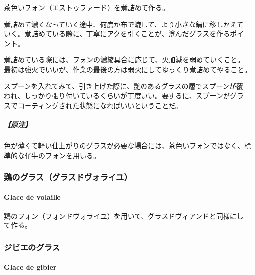 \begin{recette}
茶色いフォン（エストゥファード）を煮詰めて作る。

煮詰めて濃くなっていく途中、何度か布で漉して、より小さな鍋に移しかえて
いく。煮詰めている際に、丁寧にアクを引くことが、澄んだグラスを作るポイ
ント。

煮詰めている際には、フォンの濃縮具合に応じて、火加減を弱めていくこと。
最初は強火でいいが、作業の最後の方は弱火にしてゆっくり煮詰めてやること。

スプーンを入れてみて、引き上げた際に、艶のあるグラスの層でスプーンが覆
われ、しっかり張り付いているくらいが丁度いい。要するに、スプーンがグラ
スでコーティングされた状態になればいいということだ。

\hypertarget{nota-glace-de-viande}{%
\subparagraph{【原注】}\label{nota-glace-de-viande}}

色が薄くて軽い仕上がりのグラスが必要な場合には、茶色いフォンではなく、標
準的な仔牛のフォンを用いる。

\maeaki

\hypertarget{fondsdevolaille}{%
\subsubsection{鶏のグラス（グラスドヴォライユ）}\label{fondsdevolaille}}

\hypertarget{glace-de-volaille}{%
\paragraph{Glace de volaille}\label{glace-de-volaille}}


鶏のフォン（フォンドヴォライユ）を用いて、グラスドヴィアンドと同様にし
て作る。

\maeaki

\hypertarget{glacedegibier}{%
\subsubsection{ジビエのグラス}\label{glacedegibier}}

\hypertarget{glace-de-gibier}{%
\paragraph{Glace de gibier}\label{glace-de-gibier}}



\end{recette}
